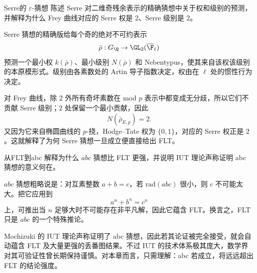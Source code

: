 \begin{problem}{Serre的 $\varepsilon$-猜想}
陈述 Serre 对二维奇残余表示的精确猜想中关于权和级别的预测，并解释为什么 Frey 曲线对应的 Serre 权是 $2$、Serre 级别是 $2$。
\end{problem}
\begin{solution}
Serre 猜想的精确版给每个奇的绝对不可约表示
\[
\bar\rho:G_\Q\to \GL_2(\overline{\F}_\ell)
\]
预测一个最小权 $k(\bar\rho)$、最小级别 $N(\bar\rho)$ 和 Nebentypus，使其来自该权该级别的本原模形式。级别由各素数处的 Artin 导子指数决定，权由在 $\ell$ 处的惯性行为决定。

对 Frey 曲线，除 $2$ 外所有奇坏素数在 mod $p$ 表示中都变成无分歧，所以它们不贡献 Serre 级别；$2$ 处保留一个最小贡献，因此
\[
N(\bar\rho_{E,p})=2.
\]
又因为它来自椭圆曲线的 $p$-挠，Hodge--Tate 权为 $\{0,1\}$，对应的 Serre 权正是 $2$。这就解释了为何 Serre 猜想一旦成立便直接给出 FLT。
\end{solution}

\begin{problem}{从FLT到abc}
解释为什么 $abc$ 猜想比 FLT 更强，并说明 IUT 理论声称证明 abc 猜想的意义何在。
\end{problem}
\begin{solution}
$abc$ 猜想粗略说是：对互素整数 $a+b=c$，若 $\mathrm{rad}(abc)$ 很小，则 $c$ 不可能太大。把它应用到
\[
a^n+b^n=c^n
\]
上，可推出当 $n$ 足够大时不可能存在非平凡解，因此它蕴含 FLT。换言之，FLT 只是 $abc$ 的一个特殊推论。

Mochizuki 的 IUT 理论声称证明了 abc 猜想，因此若其论证被完全接受，就会自动蕴含 FLT 及大量更强的丢番图结果。不过 IUT 的技术体系极其庞大，数学界对其可验证性曾长期保持谨慎。对本章而言，只需理解：abc 若成立，将远远超出 FLT 的结论强度。
\end{solution}
